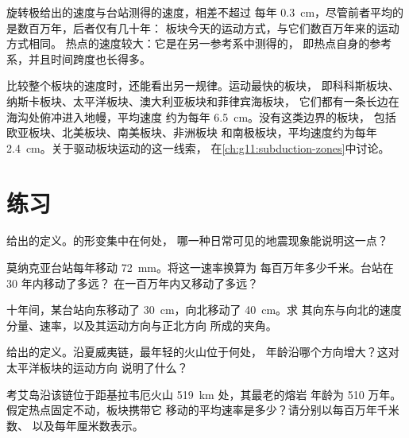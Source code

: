 旋转极给出的速度与台站测得的速度，相差不超过
每年 \qty{0.3}{cm}，尽管前者平均的是数百万年，后者仅有几十年：
板块今天的运动方式，与它们数百万年来的运动方式相同。
热点的速度较大：它是在另一参考系中测得的，
即热点自身的参考系，并且时间跨度也长得多。

比较整个板块的速度时，还能看出另一规律。运动最快的板块，
即科科斯板块、纳斯卡板块、太平洋板块、澳大利亚板块和菲律宾海板块，
它们都有一条长边在海沟处俯冲进入地幔，平均速度
约为每年 \qty{6.5}{cm}。没有这类边界的板块，
包括欧亚板块、北美板块、南美板块、非洲板块
和南极板块，平均速度约为每年 \qty{2.4}{cm}。关于驱动板块运动的这一线索，
在\cref{ch:g11:subduction-zones}中讨论。

\section{练习}

\begin{exercise}[$\star$]\label{exo:g11:plate-motions:1}
给出的定义。的形变集中在何处，
哪一种日常可见的地震现象能说明这一点？
\end{exercise}

\begin{exercise}[$\star$]\label{exo:g11:plate-motions:2}
莫纳克亚台站每年移动 \qty{72}{mm}。将这一速率换算为
每百万年多少千米。台站在 30 年内移动了多远？
在一百万年内又移动了多远？
\end{exercise}

\begin{exercise}[$\star$]\label{exo:g11:plate-motions:3}
十年间，某台站向东移动了 \qty{30}{cm}，向北移动了 \qty{40}{cm}。求
其向东与向北的速度分量、速率，以及其运动方向与正北方向
所成的夹角。
\end{exercise}

\begin{exercise}[$\star$]\label{exo:g11:plate-motions:4}
给出的定义。沿夏威夷链，最年轻的火山位于何处，
年龄沿哪个方向增大？这对太平洋板块的运动方向
说明了什么？
\end{exercise}

\begin{exercise}[$\star$]\label{exo:g11:plate-motions:5}
考艾岛沿该链位于距基拉韦厄火山 \qty{519}{km} 处，其最老的熔岩
年龄为 510 万年。假定热点固定不动，板块携带它
移动的平均速率是多少？请分别以每百万年千米数、
以及每年厘米数表示。
\end{exercise}

